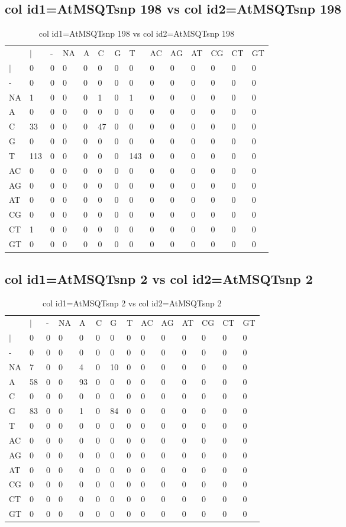 \subsection{col id1=AtMSQTsnp 198 vs col id2=AtMSQTsnp 198}
\begin{center}
\begin{longtable}{|l|l|l|l|l|l|l|l|l|l|l|l|l|l|}
\caption{col id1=AtMSQTsnp 198 vs col id2=AtMSQTsnp 198} \label{table_dm764}\\
\hline
\\
\hline
&$|$&-&NA&A&C&G&T&AC&AG&AT&CG&CT&GT\\
$|$&0&0&0&0&0&0&0&0&0&0&0&0&0\\
-&0&0&0&0&0&0&0&0&0&0&0&0&0\\
NA&1&0&0&0&1&0&1&0&0&0&0&0&0\\
A&0&0&0&0&0&0&0&0&0&0&0&0&0\\
C&33&0&0&0&47&0&0&0&0&0&0&0&0\\
G&0&0&0&0&0&0&0&0&0&0&0&0&0\\
T&113&0&0&0&0&0&143&0&0&0&0&0&0\\
AC&0&0&0&0&0&0&0&0&0&0&0&0&0\\
AG&0&0&0&0&0&0&0&0&0&0&0&0&0\\
AT&0&0&0&0&0&0&0&0&0&0&0&0&0\\
CG&0&0&0&0&0&0&0&0&0&0&0&0&0\\
CT&1&0&0&0&0&0&0&0&0&0&0&0&0\\
GT&0&0&0&0&0&0&0&0&0&0&0&0&0\\
\hline
\end{longtable}
\end{center}

\subsection{col id1=AtMSQTsnp 2 vs col id2=AtMSQTsnp 2}
\begin{center}
\begin{longtable}{|l|l|l|l|l|l|l|l|l|l|l|l|l|l|}
\caption{col id1=AtMSQTsnp 2 vs col id2=AtMSQTsnp 2} \label{table_dm766}\\
\hline
\\
\hline
&$|$&-&NA&A&C&G&T&AC&AG&AT&CG&CT&GT\\
$|$&0&0&0&0&0&0&0&0&0&0&0&0&0\\
-&0&0&0&0&0&0&0&0&0&0&0&0&0\\
NA&7&0&0&4&0&10&0&0&0&0&0&0&0\\
A&58&0&0&93&0&0&0&0&0&0&0&0&0\\
C&0&0&0&0&0&0&0&0&0&0&0&0&0\\
G&83&0&0&1&0&84&0&0&0&0&0&0&0\\
T&0&0&0&0&0&0&0&0&0&0&0&0&0\\
AC&0&0&0&0&0&0&0&0&0&0&0&0&0\\
AG&0&0&0&0&0&0&0&0&0&0&0&0&0\\
AT&0&0&0&0&0&0&0&0&0&0&0&0&0\\
CG&0&0&0&0&0&0&0&0&0&0&0&0&0\\
CT&0&0&0&0&0&0&0&0&0&0&0&0&0\\
GT&0&0&0&0&0&0&0&0&0&0&0&0&0\\
\hline
\end{longtable}
\end{center}

